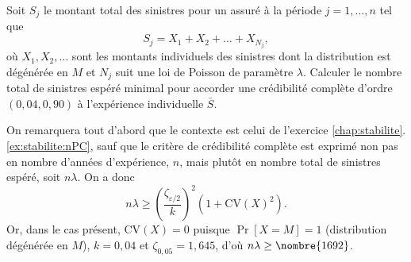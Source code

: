 \begin{exercice}
  Soit $S_j$ le montant total des sinistres pour un assuré à la
  période $j = 1, \dots, n$ tel que
  \begin{displaymath}
    S_j = X_1 + X_2 + \dots + X_{N_j},
  \end{displaymath}
  où $X_1, X_2, \dots$ sont les montants individuels des sinistres
  dont la distribution est dégénérée en $M$ et $N_j$ suit une loi de
  Poisson de paramètre $\lambda$. Calculer le nombre total de
  sinistres espéré minimal pour accorder une crédibilité complète
  d'ordre $(0,04, 0,90)$ à l'expérience individuelle $\bar{S}$.
  \begin{rep}
  \end{rep}
  \begin{sol}
    On remarquera tout d'abord que le contexte est celui de l'exercice
    \ref{chap:stabilite}.\ref{ex:stabilite:nPC}, sauf que le critère
    de crédibilité complète est exprimé non pas en nombre d'années
    d'expérience, $n$, mais plutôt en nombre total de sinistres
    espéré, soit $n \lambda$. On a donc
    \begin{displaymath}
      n \lambda \geq
      \left(
        \frac{\zeta_{\varepsilon/2}}{k}
      \right)^2
      (1 + \mathrm{CV}(X)^2).
    \end{displaymath}
    Or, dans le cas présent, $\mathrm{CV}(X) = 0$ puisque $\Pr[X = M]
    = 1$ (distribution dégénérée en $M$), $k = 0,04$ et $\zeta_{0,05}
    = 1,645$, d'où $n \lambda \geq \nombre{1692}$.
  \end{sol}
\end{exercice}

